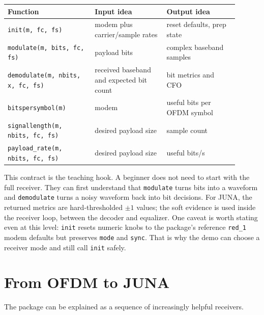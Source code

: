 \documentclass[11pt]{article}
\newcommand{\code}[1]{\texttt{#1}}
\newcommand{\juna}{JUNA}
\begin{document}
\begin{center}
\begin{tabular}{p{0.34\linewidth}p{0.28\linewidth}p{0.28\linewidth}}
\toprule
Function & Input idea & Output idea \\
\midrule
\code{init(m, fc, fs)} & modem plus carrier/sample rates & reset defaults, prep state \\
\code{modulate(m, bits, fc, fs)} & payload bits & complex baseband samples \\
\code{demodulate(m, nbits, x, fc, fs)} & received baseband and expected bit count & bit metrics and CFO \\
\code{bitspersymbol(m)} & modem & useful bits per OFDM symbol \\
\code{signallength(m, nbits, fc, fs)} & desired payload size & sample count \\
\code{payload\_rate(m, nbits, fc, fs)} & desired payload size & useful bits/s \\
\bottomrule
\end{tabular}
\end{center}

This contract is the teaching hook. A beginner does not need to start with the
full receiver. They can first understand that \code{modulate} turns bits into a
waveform and \code{demodulate} turns a noisy waveform back into bit decisions.
For \juna{}, the returned metrics are hard-thresholded \(\pm 1\) values; the
soft evidence is used inside the receiver loop, between the decoder and
equalizer.
One caveat is worth stating even at this level: \code{init} resets numeric knobs
to the package's reference \code{red\_1} modem defaults but preserves
\code{mode} and \code{sync}. That is why the demo can choose a receiver mode and
still call \code{init} safely.

\section{From OFDM to \juna{}}

The package can be explained as a sequence of increasingly helpful receivers.
\end{document}
